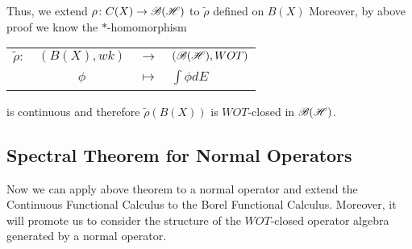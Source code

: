 \documentclass[a4paper,11pt]{report}
\begin{document}
\begin{rem}
	Thus, we extend $\rho \colon C(X) \rightarrow \mathscr{B(H)}$ to $\tilde{\rho}$ defined on $B(X)$ Moreover, by above proof we know the $*$-homomorphism
	\begin{center}
		\begin{tabular}{l c c l}
			$\tilde{\rho} \colon$ & $(B(X),wk)$ & $\longrightarrow$ & $(\mathscr{B(H)},WOT)$ \\
			~ & $\phi$ & $\longmapsto$ & $\int \phi dE$
		\end{tabular}
	\end{center}
	is continuous and therefore $\tilde{\rho}(B(X))$ is $WOT$-closed in $\mathscr{B(H)}$.
\end{rem}

\subsection{Spectral Theorem for Normal Operators}

Now we can apply above theorem to a normal operator and extend the Continuous Functional Calculus to the Borel Functional Calculus. Moreover, it will promote us to consider the structure of the $WOT$-closed operator algebra generated by a normal operator.
\end{document}
